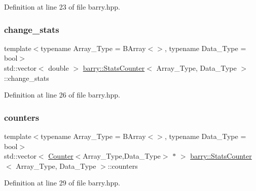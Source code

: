 Definition at line 23 of file barry.\+hpp.

\mbox{\label{classbarry_1_1_stats_counter_a90b8fddb02b2628cc8d71986f8cdf0ed}} 
\subsubsection{\texorpdfstring{change\+\_\+stats}{change\_stats}}
{\footnotesize\ttfamily template$<$typename Array\+\_\+\+Type  = B\+Array$<$$>$, typename Data\+\_\+\+Type  = bool$>$ \\
std\+::vector$<$ double $>$ \hyperlink{classbarry_1_1_stats_counter}{barry\+::\+Stats\+Counter}$<$ Array\+\_\+\+Type, Data\+\_\+\+Type $>$\+::change\+\_\+stats}



Definition at line 26 of file barry.\+hpp.

\mbox{\label{classbarry_1_1_stats_counter_a691b13aff3386ec6519f0712fa65c8f7}} 
\subsubsection{\texorpdfstring{counters}{counters}}
{\footnotesize\ttfamily template$<$typename Array\+\_\+\+Type  = B\+Array$<$$>$, typename Data\+\_\+\+Type  = bool$>$ \\
std\+::vector$<$ \hyperlink{classbarry_1_1_counter}{Counter}$<$Array\+\_\+\+Type,Data\+\_\+\+Type$>$ $\ast$ $>$ \hyperlink{classbarry_1_1_stats_counter}{barry\+::\+Stats\+Counter}$<$ Array\+\_\+\+Type, Data\+\_\+\+Type $>$\+::counters}



Definition at line 29 of file barry.\+hpp.

\mbox{\label{classbarry_1_1_stats_counter_ad99718884cffbeca3cb98d574f6956a1}} 

